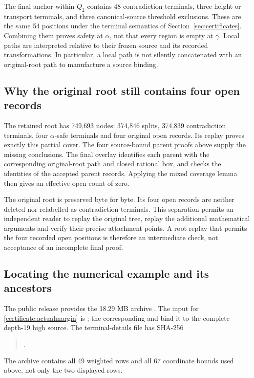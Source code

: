 \documentclass[11pt,reqno]{amsart}
\theoremstyle{definition}
\theoremstyle{remark}
\newcommand{\gam}{\gamma}
\begin{document}
The final anchor within \(Q_2\) contains 48 contradiction terminals,
three height or transport terminals, and three canonical-source
threshold exclusions. These are the same 54 positions under the
terminal semantics of Section~\ref{sec:certificates}. Combining them
proves safety at \(\alpha\), not that every region is empty at
\(\gam\). Local paths are interpreted relative to their frozen source
and its recorded transformations. In particular, a local path is not
silently concatenated with an original-root path to manufacture a
source binding.

\subsection{Why the original root still contains four open records}
\label{certificate:rootbytes}

The retained root has 749,693 nodes: 374,846 splits, 374,839
contradiction terminals, four \(\alpha\)-safe terminals and four
original open records. Its replay proves exactly this partial cover.
The four source-bound parent proofs above supply the missing
conclusions. The final overlay identifies each parent with the
corresponding original-root path and closed rational box, and checks
the identities of the accepted parent records. Applying the mixed
coverage lemma then gives an effective open count of zero.

The original root is preserved byte for byte. Its four open records
are neither deleted nor relabelled as contradiction terminals. This
separation permits an independent reader to replay the original tree,
replay the additional mathematical arguments and verify their precise
attachment points. A root replay that permits the four recorded open
positions is therefore an intermediate check, not acceptance of an
incomplete final proof.

\subsection{Locating the numerical example and its ancestors}
\label{certificate:exampledata}

The public release provides the 18.29 MB archive
. The input for
\eqref{certificate:actualmargin} is
; the corresponding
 and
 bind it to the complete
depth-19 high source. The terminal-details file has SHA-256
\begin{quote}\small
{}.
\end{quote}
The archive contains all 49 weighted rows and all 67 coordinate
bounds used above, not only the two displayed rows.
\end{document}
